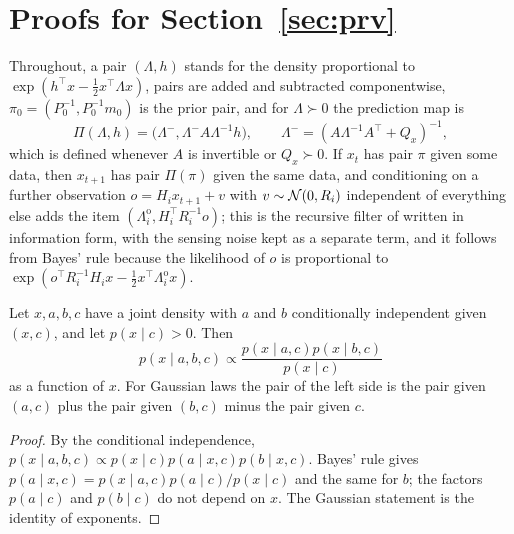 \section{Proofs for \texorpdfstring{Section~\ref{sec:prv}}{evidence provenance}}\label{app:prv}

Throughout, a pair $(\Lambda,h)$ stands for the density proportional to $\exp(h^\top x-\frac12x^\top\Lambda x)$, pairs are added and subtracted componentwise, $\pi_0=(P_0^{-1},P_0^{-1}m_0)$ is the prior pair, and for $\Lambda\succ0$ the prediction map is
\begin{equation}\label{eq:prv-predict}
\Pi(\Lambda,h)=\bigl(\Lambda^-,\Lambda^-A\Lambda^{-1}h\bigr),\qquad\Lambda^-=(A\Lambda^{-1}A^\top+Q_x)^{-1},
\end{equation}
which is defined whenever $A$ is invertible or $Q_x\succ0$. If $x_t$ has pair $\pi$ given some data, then $x_{t+1}$ has pair $\Pi(\pi)$ given the same data, and conditioning on a further observation $o=H_ix_{t+1}+v$ with $v\sim\mathcal{N}(0,R_i)$ independent of everything else adds the item $(\Lambda^{\mathrm o}_i,H_i^\top R_i^{-1}o)$; this is the recursive filter of \citet{kalman1960new} written in information form, with the sensing noise kept as a separate term, and it follows from Bayes' rule because the likelihood of $o$ is proportional to $\exp(o^\top R_i^{-1}H_ix-\frac12x^\top\Lambda^{\mathrm o}_ix)$.

\begin{lemma}\label{lem:prv-fusion}
Let $x,a,b,c$ have a joint density with $a$ and $b$ conditionally independent given $(x,c)$, and let $p(x\mid c)>0$. Then
\begin{equation}\label{eq:prv-fusion}
p(x\mid a,b,c)\propto\frac{p(x\mid a,c)p(x\mid b,c)}{p(x\mid c)}
\end{equation}
as a function of $x$. For Gaussian laws the pair of the left side is the pair given $(a,c)$ plus the pair given $(b,c)$ minus the pair given $c$.
\end{lemma}

\begin{proof}
By the conditional independence, $p(x\mid a,b,c)\propto p(x\mid c)p(a\mid x,c)p(b\mid x,c)$. Bayes' rule gives $p(a\mid x,c)=p(x\mid a,c)p(a\mid c)/p(x\mid c)$ and the same for $b$; the factors $p(a\mid c)$ and $p(b\mid c)$ do not depend on $x$. The Gaussian statement is the identity of exponents.
\end{proof}

